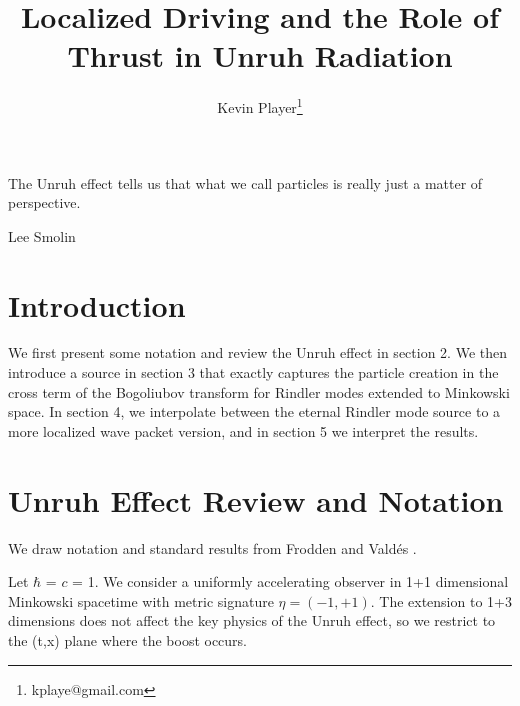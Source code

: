 \documentclass[12pt,a4paper]{article}
\begin{document}
\title{Localized Driving and the Role of Thrust in Unruh Radiation}
\author[1]{Kevin Player\footnote{kplaye@gmail.com}}

\maketitle

\epigraph{The Unruh effect tells us that what we call particles is really just a matter of perspective.}{Lee Smolin}


\section{Introduction}
We first present some notation and review the Unruh effect in section 2.  We then introduce a source in section 3 that exactly captures the particle creation in the cross term of the Bogoliubov transform for Rindler modes extended to Minkowski space.  In section 4,  we interpolate between the eternal Rindler mode source to a more localized wave packet version, and in section 5 we interpret the results.

\section{Unruh Effect Review and Notation}

We draw notation and standard results from Frodden and Vald{\'{e}}s \cite{Frodden}.


Let $\hbar$ = $c$ = 1. We consider a uniformly accelerating observer in 1+1 dimensional Minkowski spacetime with metric signature $\eta=(-1,+1)$. The extension to 1+3 dimensions does not affect the key physics of the Unruh effect, so we restrict to the (t,x) plane where the boost occurs.
\end{document}
